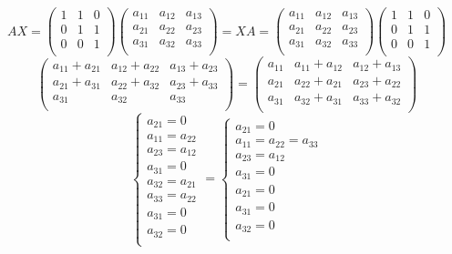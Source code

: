 \documentclass[a4paper]{article}
\begin{document}
\begin{equation*}
AX = 
\begin{pmatrix}
1 &1&0\\
0&1&1\\
0&0&1\\
\end{pmatrix}
\begin{pmatrix}
a_{11} &a_{12}&a_{13}\\
a_{21}&a_{22}&a_{23}\\
a_{31}&a_{32}&a_{33}\\
\end{pmatrix} =
XA = 
\begin{pmatrix}
a_{11} &a_{12}&a_{13}\\
a_{21}&a_{22}&a_{23}\\
a_{31}&a_{32}&a_{33}\\
\end{pmatrix}
\begin{pmatrix}
1 &1&0\\
0&1&1\\
0&0&1\\
\end{pmatrix}
\end{equation*}
\begin{equation*}
\begin{pmatrix}
a_{11} + a_{21}&a_{12} + a_{22}&a_{13} + a_{23}\\
a_{21} + a_{31}&a_{22} + a_{32}&a_{23} + a_{33}\\
a_{31}&a_{32}&a_{33}\\
\end{pmatrix} = 
\begin{pmatrix}
a_{11} & a_{11} + a_{12}& a_{12} + a_{13}\\
a_{21}&a_{22} + a_{21}&a_{23} + a_{22}\\
a_{31}&a_{32} + a_{31}&a_{33} + a_{32}\\
\end{pmatrix}
\end{equation*}
\begin{equation*}
\begin{cases}
a_{21} = 0\\
a_{11} = a_{22}\\
a_{23} = a_{12}\\
a_{31} = 0\\
a_{32} = a_{21}\\
a_{33} = a_{22}\\
a_{31} = 0\\
a_{32} = 0\\
\end{cases}
=
\begin{cases}
a_{21} = 0\\
a_{11} = a_{22} = a_{33}\\
a_{23} = a_{12}\\
a_{31} = 0\\
a_{21} = 0\\
a_{31} = 0\\
a_{32} = 0\\
\end{cases}
\end{equation*}
\end{document}
